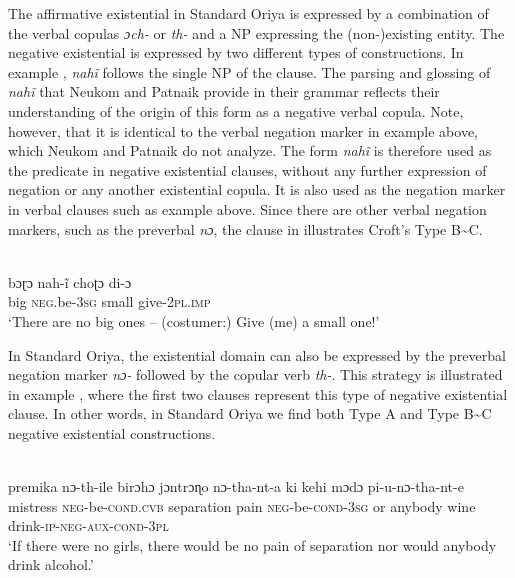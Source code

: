 \documentclass[output=paper]{langsci/langscibook}
\begin{document}
The affirmative existential in Standard Oriya is expressed by a
combination of the verbal copulas \textit{ɔch-} or \textit{th-} and a NP
expressing the (non-)existing entity. The negative existential is expressed
by two different types of constructions. In example
, \textit{nahĩ} follows the single NP of the
clause. The parsing and glossing of \textit{nahĩ} that Neukom and Patnaik
provide in their grammar reflects their understanding of the origin of this
form as a negative verbal copula.  Note, however, that it is identical to
the verbal negation marker in example  above,
which Neukom and Patnaik do not analyze.  The form \textit{nahĩ} is
therefore used as the predicate in negative existential clauses, without
any further expression of negation or any another existential copula. It is
also used as the negation marker in verbal clauses such as example
 above. Since there are other verbal negation
markers, such as the preverbal \textit{nɔ}, the clause in
 illustrates Croft's Type B{\textasciitilde}C. 
%
\begin{exe}\ex\label{ex:ieur-oriya-nobig}
\\
    \gll bɔɽɔ nah-ĩ choʈɔ di-ɔ \\
big   \textsc{neg}.be-\textsc{3sg}  small give-\textsc{2pl.imp} \\
    \glt `There are no big ones – (costumer:) Give (me) a small one!'
    \end{exe}

In Standard Oriya, the existential domain can also be expressed
by the preverbal negation marker \textit{nɔ-} followed by the copular verb
\textit{th-}. This strategy is illustrated in example
, where the first two clauses represent this type of negative existential clause. In other words, in Standard Oriya we find both Type A and Type B{\textasciitilde}C negative existential constructions. 
%
\begin{exe}\ex\label{ex:ieur-oriya-nogirls}
\\
    \gll premika nɔ-th-ile birɔhɔ jɔntrɔɳo nɔ-tha-nt-a ki kehi mɔdɔ
    pi-u-nɔ-tha-nt-e \\
mistress \textsc{neg}-be-\textsc{cond.cvb} separation pain
\textsc{neg}-be-\textsc{cond-3sg} or anybody wine
drink-\textsc{ip-neg-aux-cond-3pl} \\
    \glt `If there were no girls, there would be no pain of separation nor
would anybody drink alcohol.'
    \end{exe} 
\end{document}

